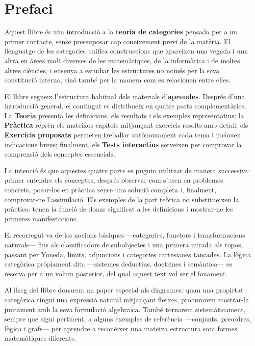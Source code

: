 \chapter*{Prefaci}

Aquest llibre és una introducció a la \textbf{teoria de categories} pensada per a un primer contacte, sense pressuposar cap coneixement previ de la matèria. El llenguatge de les categories unifica construccions que apareixen una vegada i una altra en àrees molt diverses de les matemàtiques, de la informàtica i de moltes altres ciències, i ensenya a estudiar les estructures no només per la seva constitució interna, sinó també per la manera com es relacionen entre elles.

El llibre segueix l'estructura habitual dels materials d'\textbf{aprendes}. Després d'una introducció general, el contingut es distribueix en quatre parts complementàries. La \textbf{Teoria} presenta les definicions, els resultats i els exemples representatius; la \textbf{Pràctica} reprèn els mateixos capítols mitjançant exercicis resolts amb detall; els \textbf{Exercicis proposats} permeten treballar autònomament cada tema i inclouen indicacions breus; finalment, els \textbf{Tests interactius} serveixen per comprovar la comprensió dels conceptes essencials.

La intenció és que aquestes quatre parts es puguin utilitzar de manera successiva: primer entendre els conceptes, després observar com s'usen en problemes concrets, posar-los en pràctica sense una solució completa i, finalment, comprovar-ne l'assimilació. Els exemples de la part teòrica no substitueixen la pràctica: tenen la funció de donar significat a les definicions i mostrar-ne les primeres manifestacions.

El recorregut va de les nocions bàsiques ---categories, functors i transformacions naturals--- fins als classificadors de subobjectes i una primera mirada als topos, passant per Yoneda, límits, adjuncions i categories cartesianes tancades. La lògica categòrica pròpiament dita ---sistemes deductius, doctrines i semàntica--- es reserva per a un volum posterior, del qual aquest text vol ser el fonament.

Al llarg del llibre donarem un paper especial als diagrames: quan una propietat categòrica tingui una expressió natural mitjançant fletxes, procurarem mostrar-la juntament amb la seva formulació algebraica. També tornarem sistemàticament, sempre que sigui pertinent, a alguns exemples de referència ---conjunts, preordres, lògica i grafs--- per aprendre a reconèixer una mateixa estructura sota formes matemàtiques diferents. 